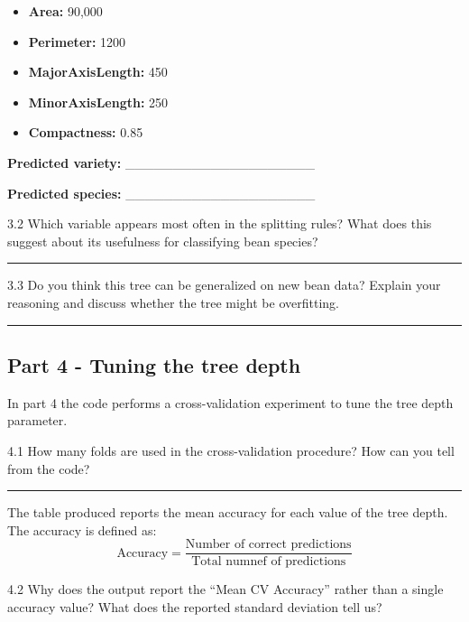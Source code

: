 \documentclass[
  a4paper,
  DIV=11,
  numbers=noendperiod]{scrartcl}
\providecommand{\tightlist}{%
  \setlength{\itemsep}{0pt}\setlength{\parskip}{0pt}}
\begin{document}
\begin{itemize}
\tightlist
\item
  \textbf{Area:} 90,000
\item
  \textbf{Perimeter:} 1200
\item
  \textbf{MajorAxisLength:} 450
\item
  \textbf{MinorAxisLength:} 250
\item
  \textbf{Compactness:} 0.85
\end{itemize}

\textbf{Predicted variety:} \_\_\_\_\_\_\_\_\_\_\_\_\_\_\_\_\_\_\_\_

\textbf{Predicted species:} \_\_\_\_\_\_\_\_\_\_\_\_\_\_\_\_\_\_\_\_

3.2 Which variable appears most often in the splitting rules? What does
this suggest about its usefulness for classifying bean species?

\begin{center}\rule{0.5\linewidth}{0.5pt}\end{center}

3.3 Do you think this tree can be generalized on new bean data? Explain
your reasoning and discuss whether the tree might be overfitting.

\begin{center}\rule{0.5\linewidth}{0.5pt}\end{center}

\subsection{Part 4 - Tuning the tree
depth}\label{part-4---tuning-the-tree-depth}

In part 4 the code performs a cross-validation experiment to tune the
tree depth parameter.

4.1 How many folds are used in the cross-validation procedure? How can
you tell from the code?

\begin{center}\rule{0.5\linewidth}{0.5pt}\end{center}

The table produced reports the mean accuracy for each value of the tree
depth. The accuracy is defined as: \[
\text{Accuracy} = \frac{\text{Number of correct predictions}}{\text{Total numnef of predictions}}
\]

4.2 Why does the output report the ``Mean CV Accuracy'' rather than a
single accuracy value? What does the reported standard deviation tell
us?
\end{document}
